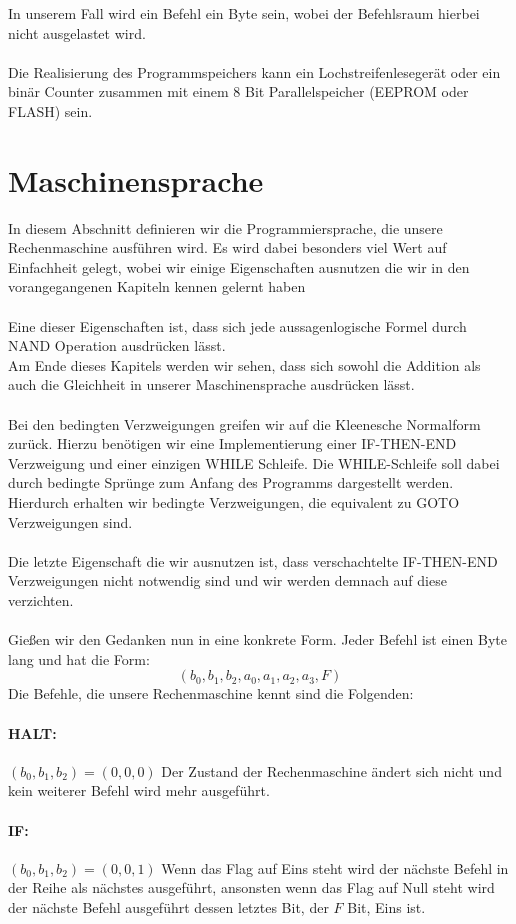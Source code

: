 \documentclass[11pt,a4paper,leqno]{report}
\numberwithin{equation}{chapter}
\begin{document}
In unserem Fall wird ein Befehl ein Byte sein, wobei der Befehlsraum hierbei nicht ausgelastet wird.\\
\\
Die Realisierung des Programmspeichers kann ein Lochstreifenleseger\"at oder ein bin\"ar Counter zusammen mit einem 8 Bit Parallelspeicher (EEPROM oder FLASH) sein.
\section{Maschinensprache}
In diesem Abschnitt definieren wir die Programmiersprache, die unsere Rechenmaschine ausf\"uhren wird. Es wird dabei besonders viel Wert auf Einfachheit gelegt, wobei wir einige Eigenschaften ausnutzen die wir in den vorangegangenen Kapiteln kennen gelernt haben\\
\\
Eine dieser Eigenschaften ist, dass sich jede aussagenlogische Formel durch NAND Operation ausdr\"ucken l\"asst.\\
Am Ende dieses Kapitels werden wir sehen, dass sich sowohl die Addition als auch die Gleichheit in unserer Maschinensprache ausdr\"ucken l\"asst.\\
\\
Bei den bedingten Verzweigungen greifen wir auf die Kleenesche Normalform zur\"uck. Hierzu ben\"otigen wir eine Implementierung einer IF-THEN-END Verzweigung und einer einzigen WHILE Schleife. Die WHILE-Schleife soll dabei durch bedingte Spr\"unge zum Anfang des Programms dargestellt werden. Hierdurch erhalten wir bedingte Verzweigungen, die equivalent zu GOTO Verzweigungen sind.\\
\\
Die letzte Eigenschaft die wir ausnutzen ist, dass verschachtelte IF-THEN-END Verzweigungen nicht notwendig sind und wir werden demnach auf diese verzichten.\\
\\
Gie\ss{}en wir den Gedanken nun in eine konkrete Form.
Jeder Befehl ist einen Byte lang und hat die Form:
$$(b_0, b_1, b_2, a_0, a_1, a_2, a_3, F)$$
Die Befehle, die unsere Rechenmaschine kennt sind die Folgenden:
\paragraph{HALT:} $(b_0, b_1, b_2) = (0, 0, 0)$ Der Zustand der Rechenmaschine \"andert sich nicht und kein weiterer Befehl wird mehr ausgef\"uhrt.
\paragraph{IF:} $(b_0, b_1, b_2) = (0, 0, 1)$ Wenn das Flag auf Eins steht wird der n\"achste Befehl in der Reihe als n\"achstes ausgef\"uhrt, ansonsten wenn das Flag auf Null steht wird der n\"achste Befehl ausgef\"uhrt dessen letztes Bit, der $F$ Bit, Eins ist.
\end{document}

